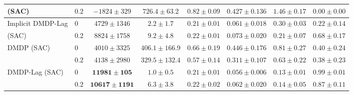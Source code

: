 \begin{tabular}{llcccccc}
(SAC) & $0.2$ & $-1824\pm329$ & $726.4\pm63.2$ & $0.82\pm0.09$ & $0.427\pm0.136$ & $1.46\pm0.17$ & $0.00\pm0.00$ \\
\midrule
Implicit DMDP-Lag & $0$ & $4729\pm1346$ & $2.2\pm1.7$ & $\bm{0.21\pm0.01}$ & $0.061\pm0.018$ & $0.30\pm0.03$ & $0.22\pm0.14$ \\
(SAC) & $0.2$ & $8824\pm1758$ & $9.2\pm4.8$ & $\bm{0.22\pm0.01}$ & $0.073\pm0.020$ & $0.21\pm0.07$ & $0.68\pm0.17$ \\
\midrule
DMDP (SAC) & $0$ & $4010\pm3325$ & $406.1\pm166.9$ & $0.66\pm0.19$ & $0.446\pm0.176$ & $0.81\pm0.27$ & $0.40\pm0.24$ \\
 & $0.2$ & $4138\pm2980$ & $329.5\pm132.4$ & $0.57\pm0.14$ & $0.311\pm0.107$ & $0.63\pm0.22$ & $0.38\pm0.23$ \\
\midrule
DMDP-Lag (SAC) & $0$ & $\bm{11981\pm105}$ & $\bm{1.0\pm0.5}$ & $\bm{0.21\pm0.01}$ & $\bm{0.056\pm0.006}$ & $\bm{0.13\pm0.01}$ & $\bm{0.99\pm0.01}$ \\
 & $0.2$ & $\bm{10617\pm1191}$ & $6.3\pm3.8$ & $\bm{0.22\pm0.02}$ & $\bm{0.062\pm0.020}$ & $\bm{0.14\pm0.05}$ & $\bm{0.87\pm0.11}$ \\
\bottomrule
\end{tabular}

